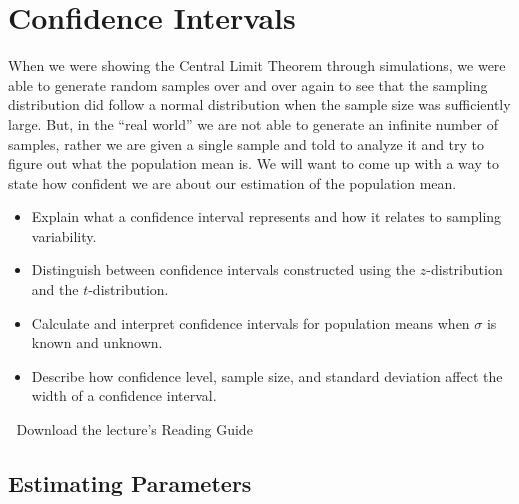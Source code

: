 \documentclass[
  letterpaper,
  DIV=11,
  numbers=noendperiod]{scrreprt}
\providecommand{\tightlist}{%
  \setlength{\itemsep}{0pt}\setlength{\parskip}{0pt}}
\begin{document}

\chapter{Confidence Intervals}\label{confidence-intervals}

When we were showing the Central Limit Theorem through simulations, we
were able to generate random samples over and over again to see that the
sampling distribution did follow a normal distribution when the sample
size was sufficiently large. But, in the ``real world'' we are not able
to generate an infinite number of samples, rather we are given a single
sample and told to analyze it and try to figure out what the population
mean is. We will want to come up with a way to state how confident we
are about our estimation of the population mean.

\begin{itemize}
\tightlist
\item
  Explain what a confidence interval represents and how it relates to
  sampling variability.
\item
  Distinguish between confidence intervals constructed using the
  \(z\)-distribution and the \(t\)-distribution.
\item
  Calculate and interpret confidence intervals for population means when
  \(\sigma\) is known and unknown.
\item
  Describe how confidence level, sample size, and standard deviation
  affect the width of a confidence interval.
\end{itemize}

\begin{tcolorbox}[enhanced jigsaw, leftrule=.75mm, arc=.35mm, coltitle=black, rightrule=.15mm, bottomrule=.15mm, toprule=.15mm, left=2mm, colbacktitle=quarto-callout-tip-color!10!white, title=\textcolor{quarto-callout-tip-color}{\faLightbulb}\hspace{0.5em}{Supplemental Material}, toptitle=1mm, breakable, colframe=quarto-callout-tip-color-frame, bottomtitle=1mm, titlerule=0mm, colback=white, opacityback=0, opacitybacktitle=0.6]

📄 Download the lecture's Reading Guide

\end{tcolorbox}

\section{Estimating Parameters}\label{estimating-parameters}
\end{document}
